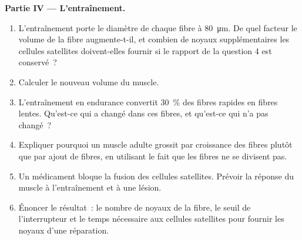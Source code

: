 \begin{problem}
\medskip
\noindent\textbf{Partie IV --- L'entraînement.}
\begin{enumerate}[resume]
  \item L'entraînement porte le diamètre de chaque fibre à
        \qty{80}{\micro m}. De quel facteur le volume de la fibre
        augmente-t-il, et combien de noyaux supplémentaires les cellules
        satellites doivent-elles fournir si le rapport de la question 4
        est conservé~?
  \item Calculer le nouveau volume du muscle.
  \item L'entraînement en endurance convertit \qty{30}{\%} des fibres
        rapides en fibres lentes. Qu'est-ce qui a changé dans ces fibres,
        et qu'est-ce qui n'a pas changé~?
  \item Expliquer pourquoi un muscle adulte grossit par croissance des
        fibres plutôt que par ajout de fibres, en utilisant le fait que
        les fibres ne se divisent pas.
  \item Un médicament bloque la fusion des cellules satellites. Prévoir
        la réponse du muscle à l'entraînement et à une lésion.
  \item Énoncer le résultat~: le nombre de noyaux de la fibre, le seuil
        de l'interrupteur et le temps nécessaire aux cellules satellites
        pour fournir les noyaux d'une réparation.
\end{enumerate}
\end{problem}
